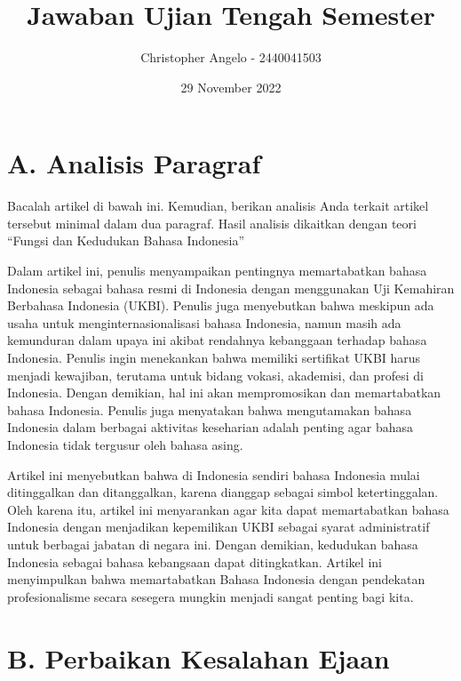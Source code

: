 \documentclass[
	10pt, %
	indonesian
]{assignment}
\author{Christopher Angelo - 2440041503}
\institute{BINUS University\\ Global Class}
\date{29 November 2022}
\title{Jawaban Ujian Tengah Semester}
\begin{document}
\maketitle


\section*{A. Analisis Paragraf}

\begin{problem}
Bacalah artikel di bawah ini. Kemudian, berikan analisis Anda terkait artikel tersebut minimal dalam dua paragraf. Hasil analisis dikaitkan dengan teori “Fungsi dan Kedudukan Bahasa Indonesia”
\end{problem}

Dalam artikel ini, penulis menyampaikan pentingnya memartabatkan bahasa Indonesia sebagai bahasa resmi di Indonesia dengan menggunakan Uji Kemahiran Berbahasa Indonesia (UKBI). Penulis juga menyebutkan bahwa meskipun ada usaha untuk menginternasionalisasi bahasa Indonesia, namun masih ada kemunduran dalam upaya ini akibat rendahnya kebanggaan terhadap bahasa Indonesia. Penulis ingin menekankan bahwa memiliki sertifikat UKBI harus menjadi kewajiban, terutama untuk bidang vokasi, akademisi, dan profesi di Indonesia. Dengan demikian, hal ini akan mempromosikan dan memartabatkan bahasa Indonesia. Penulis juga menyatakan bahwa mengutamakan bahasa Indonesia dalam berbagai aktivitas keseharian adalah penting agar bahasa Indonesia tidak tergusur oleh bahasa asing.


Artikel ini menyebutkan bahwa di Indonesia sendiri bahasa Indonesia mulai ditinggalkan dan ditanggalkan, karena dianggap sebagai simbol ketertinggalan. Oleh karena itu, artikel ini menyarankan agar kita dapat memartabatkan bahasa Indonesia dengan menjadikan kepemilikan UKBI sebagai syarat administratif untuk berbagai jabatan di negara ini. Dengan demikian, kedudukan bahasa Indonesia sebagai bahasa kebangsaan dapat ditingkatkan. Artikel ini menyimpulkan bahwa memartabatkan Bahasa Indonesia dengan pendekatan profesionalisme secara sesegera mungkin menjadi sangat penting bagi kita.

\pagebreak
\section*{B. Perbaikan Kesalahan Ejaan}
\end{document}
